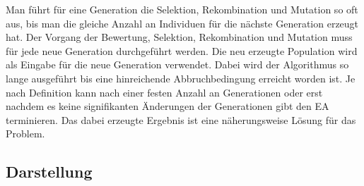 Man f{\"u}hrt f{\"u}r eine Generation die Selektion, Rekombination und Mutation so oft aus, bis man die gleiche Anzahl an Individuen f{\"u}r die n{\"a}chste Generation erzeugt hat.
Der Vorgang der Bewertung, Selektion, Rekombination und Mutation muss f{\"u}r jede neue Generation durchgef{\"u}hrt werden. 
Die neu erzeugte Population wird als Eingabe f{\"u}r die neue Generation verwendet. 
Dabei wird der Algorithmus so lange ausgef{\"u}hrt bis eine hinreichende Abbruchbedingung erreicht worden ist. 
Je nach Definition kann nach einer festen Anzahl an Generationen oder erst nachdem es keine signifikanten {\"A}nderungen der Generationen gibt den EA terminieren.
Das dabei erzeugte Ergebnis ist eine n{\"a}herungsweise L{\"o}sung f{\"u}r das Problem.

\subsection{Darstellung}







